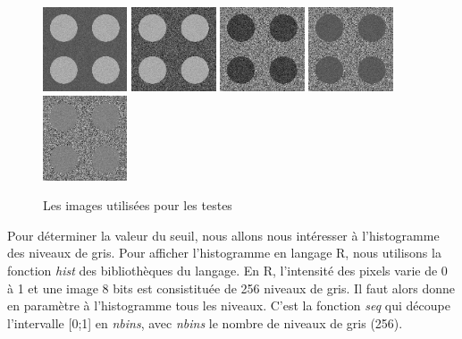 \documentclass[11pt]{article}
\begin{document}
  \begin{figure}[H]
    \center
    \includegraphics[width=2.5cm]{texture-0/texture-0.png}
    \includegraphics[width=2.5cm]{texture-1/texture-1.png}
    \includegraphics[width=2.5cm]{texture-2/texture-2.png}
    \includegraphics[width=2.5cm]{texture-3/texture-3.png}
    \includegraphics[width=2.5cm]{texture-4/texture-4.png}
    \caption{Les images utilisées pour les testes}
  \end{figure}
  
  Pour déterminer la valeur du seuil, nous allons nous intéresser à l'histogramme des niveaux de gris. Pour 
  afficher l'histogramme en langage R, nous utilisons la fonction \textit{hist} des bibliothèques du langage.
  En R, l'intensité des pixels varie de 0 à 1 et une image 8 bits est consistituée de 256 niveaux de gris.
  Il faut alors donne en paramètre à l'histogramme tous les niveaux. C'est la fonction \textit{seq} qui
  découpe l'intervalle [0;1] en \textit{nbins}, avec \textit{nbins} le nombre de niveaux de gris (256).\\
  
\end{document}
